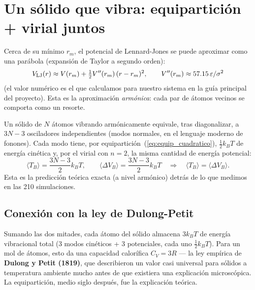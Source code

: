 \documentclass[11pt,a4paper]{article}
\newcommand{\eps}{\varepsilon}
\newcommand{\kb}{k_B}
\begin{document}
\section{Un sólido que vibra: equipartición + virial juntos}
\label{sec:solido_armonico}

Cerca de su mínimo $r_m$, el potencial de Lennard-Jones se puede aproximar
como una parábola (expansión de Taylor a segundo orden):
\begin{equation}
V_{\rm LJ}(r) \approx V(r_m) + \tfrac12 V''(r_m)\,(r-r_m)^2,
\qquad V''(r_m) \approx 57.15\,\eps/\sigma^2
\label{eq:taylor2}
\end{equation}
(el valor numérico es el que calculamos para nuestro sistema en la guía
principal del proyecto). Esta es la aproximación \emph{armónica}: cada par
de átomos vecinos se comporta como un resorte.

Un sólido de $N$ átomos vibrando armónicamente equivale, tras
diagonalizar, a $3N-3$ osciladores independientes (modos normales, en el
lenguaje moderno de fonones). Cada modo tiene, por
equipartición~(\ref{eq:equip_cuadratico}), $\tfrac12\kb T$ de energía
cinética y, por el virial con $n=2$, la misma cantidad de energía
potencial:
\begin{equation}
\langle T_B\rangle = \frac{3N-3}{2}\kb T, \qquad
\langle \Delta V_B\rangle = \frac{3N-3}{2}\kb T
\quad\Longrightarrow\quad
\langle T_B\rangle = \langle \Delta V_B\rangle.
\label{eq:virial_solido}
\end{equation}
Esta es la predicción teórica exacta (a nivel armónico) detrás de lo que
medimos en las 210 simulaciones.

\subsection{Conexión con la ley de Dulong-Petit}

Sumando las dos mitades, cada átomo del sólido almacena $3\kb T$ de
energía vibracional total (3 modos cinéticos + 3 potenciales, cada uno
$\tfrac12\kb T$). Para un mol de átomos, esto da una capacidad calorífica
$C_V = 3R$ --- la ley empírica de \textbf{Dulong y Petit (1819)}, que
describieron un valor casi universal para sólidos a temperatura ambiente
mucho antes de que existiera una explicación microscópica. La
equipartición, medio siglo después, fue la explicación teórica.
\end{document}
